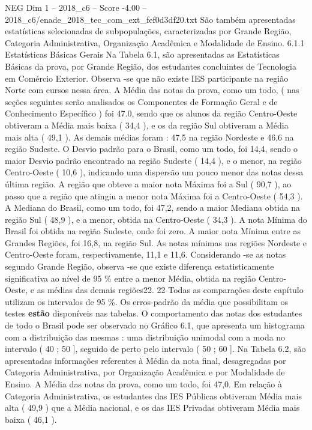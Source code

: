 \begin{textsample}{NEG Dim 1 – 2018\_c6 – Score -4.00 – 2018\_c6/enade\_2018\_tec\_com\_ext\_fef0d3df20.txt}
São também apresentadas estatísticas selecionadas de subpopulações, caracterizadas por Grande Região, Categoria Administrativa, Organização Acadêmica e Modalidade de Ensino. 6.1.1 Estatísticas Básicas Gerais Na Tabela 6.1, são apresentadas as Estatísticas Básicas da prova, por Grande Região, dos estudantes concluintes de Tecnologia em Comércio Exterior.
Observa -se que não existe IES participante na região Norte com cursos nessa área.
A Média das notas da prova, como um todo, ( nas seções seguintes serão analisados os Componentes de Formação Geral e de Conhecimento Específico ) foi 47.0, sendo que os alunos da região Centro-Oeste obtiveram a Média mais baixa ( 34,4 ), e os da região Sul obtiveram a Média mais alta ( 49,1 ).
As demais médias foram : 47,5 na região Nordeste e 46,6 na região Sudeste.
O Desvio padrão para o Brasil, como um todo, foi 14,4, sendo o maior Desvio padrão encontrado na região Sudeste ( 14,4 ), e o menor, na região Centro-Oeste ( 10,6 ), indicando uma dispersão um pouco menor das notas dessa última região.
A região que obteve a maior nota Máxima foi a Sul ( 90,7 ), ao passo que a região que atingiu a menor nota Máxima foi a Centro-Oeste ( 54,3 ).
A Mediana do Brasil, como um todo, foi 47,2, sendo a maior Mediana obtida na região Sul ( 48,9 ), e a menor, obtida na Centro-Oeste ( 34,3 ).
A nota Mínima do Brasil foi obtida na região Sudeste, onde foi zero.
A maior nota Mínima entre as Grandes Regiões, foi 16,8, na região Sul.
As notas mínimas nas regiões Nordeste e Centro-Oeste foram, respectivamente, 11,1 e 11,6.
Considerando -se as notas segundo Grande Região, observa -se que existe diferença estatisticamente significativa ao nível de 95 \% entre a menor Média, obtida na região Centro-Oeste, e as médias das demais regiões22. 22 Todas as comparações deste capítulo utilizam os intervalos de 95 \%.
Os erros-padrão da média que possibilitam os testes \textbf{estão} disponíveis nas tabelas.
O comportamento das notas dos estudantes de todo o Brasil pode ser observado no Gráfico 6.1, que apresenta um histograma com a distribuição das mesmas : uma distribuição unimodal com a moda no intervalo ( 40 ; 50 ], seguido de perto pelo intervalo ( 50 ; 60 ].
Na Tabela 6.2, são apresentadas informações referentes à Média da nota final, desagregadas por Categoria Administrativa, por Organização Acadêmica e por Modalidade de Ensino.
A Média das notas da prova, como um todo, foi 47,0.
Em relação à Categoria Administrativa, os estudantes das IES Públicas obtiveram Média mais alta ( 49,9 ) que a Média nacional, e os das IES Privadas obtiveram Média mais baixa ( 46,1 ).

\end{textsample}
